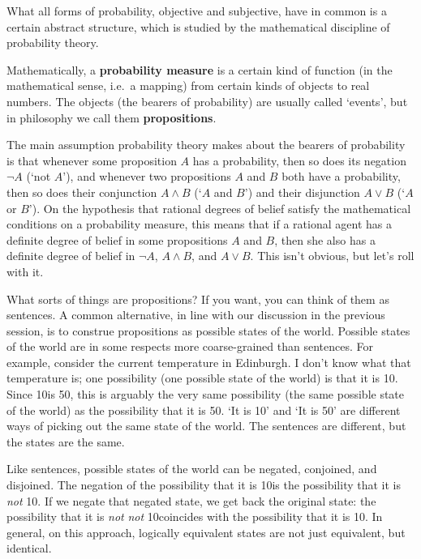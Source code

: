 What all forms of probability, objective and subjective, have in
common is a certain abstract structure, which is studied by the
mathematical discipline of probability theory.

Mathematically, a \textbf{probability measure} is a certain kind of
function (in the mathematical sense, i.e.\ a mapping) from certain
kinds of objects to real numbers. The objects (the bearers of
probability) are usually called `events', but in philosophy we call
them \textbf{propositions}.

The main assumption probability theory makes about the bearers of
probability is that whenever some proposition $A$ has a probability,
then so does its negation $\neg A$ (`not $A$'), and whenever two
propositions $A$ and $B$ both have a probability, then so does their
conjunction $A \land B$ (`$A$ and $B$') and their disjunction $A \lor
B$ (`$A$ or $B$'). On the hypothesis that rational degrees of belief
satisfy the mathematical conditions on a probability measure, this
means that if a rational agent has a definite degree of belief in some
propositions $A$ and $B$, then she also has a definite degree of
belief in $\neg A$, $A \land B$, and $A \lor B$. This isn't obvious,
but let's roll with it.


What sorts of things are propositions? If you want, you can think of
them as sentences. A common alternative, in line with our discussion
in the previous session, is to construe propositions as possible
states of the world. Possible states of the world are in some respects
more coarse-grained than sentences. For example, consider
the current temperature in Edinburgh. I don't know what that
temperature is; one possibility (one possible state of the world) is
that it is 10\celsius. Since 10\celsius is 50\fahrenheit, this is
arguably the very same possibility (the same possible state of the
world) as the possibility that it is 50\fahrenheit. `It is 10\celsius'
and `It is 50\fahrenheit' are different ways of picking out the same
state of the world. The sentences are different, but the states are
the same.

Like sentences, possible states of the world can be negated,
conjoined, and disjoined. The negation of the possibility that it is
10\celsius is the possibility that it is \emph{not} 10\celsius. If we
negate that negated state, we get back the original state: the
possibility that it is \emph{not} \emph{not} 10\celsius coincides with
the possibility that it is 10\celsius. In general, on this approach,
logically equivalent states are not just equivalent, but
identical. 


